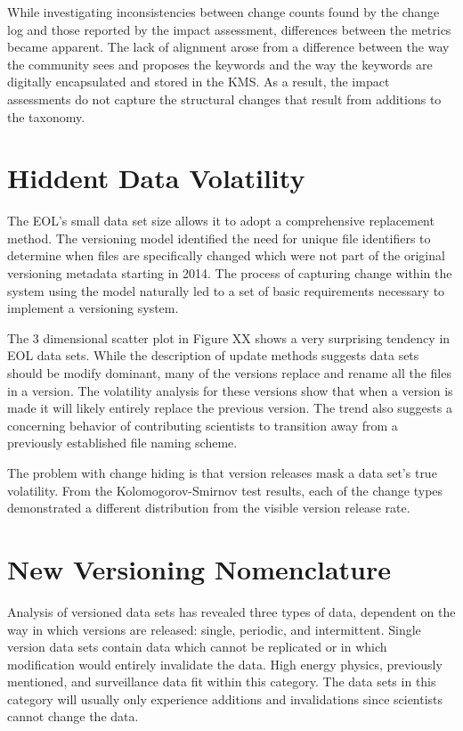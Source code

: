 While investigating inconsistencies between change counts found by the change log and those reported by the impact assessment, differences between the metrics became apparent.  
The lack of alignment arose from a difference between the way the community sees and proposes the keywords and the way the keywords are digitally encapsulated and stored in the KMS.  
As a result, the impact assessments do not capture the structural changes that result from additions to the taxonomy.

\section{Hiddent Data Volatility}

The EOL’s small data set size allows it to adopt a comprehensive replacement method.  
The versioning model identified the need for unique file identifiers to determine when files are specifically changed which were not part of the original versioning metadata starting in 2014.  
The process of capturing change within the system using the model naturally led to a set of basic requirements necessary to implement a versioning system.

The 3 dimensional scatter plot in Figure XX shows a very surprising tendency in EOL data sets.  
While the description of update methods suggests data sets should be modify dominant, many of the versions replace and rename all the files in a version.  
The volatility analysis for these versions show that when a version is made it will likely entirely replace the previous version.  
The trend also suggests a concerning behavior of contributing scientists to transition away from a previously established file naming scheme.

The problem with change hiding is that version releases mask a data set’s true volatility.  
From the Kolomogorov-Smirnov test results, each of the change types demonstrated a different distribution from the visible version release rate.


\section{New Versioning Nomenclature}
Analysis of versioned data sets has revealed three types of data, dependent on the way in which versions are released: single, periodic, and intermittent.
Single version data sets contain data which cannot be replicated or in which modification would entirely invalidate the data.
High energy physics, previously mentioned, and surveillance data fit within this category.
The data sets in this category will usually only experience additions and invalidations since scientists cannot change the data.

